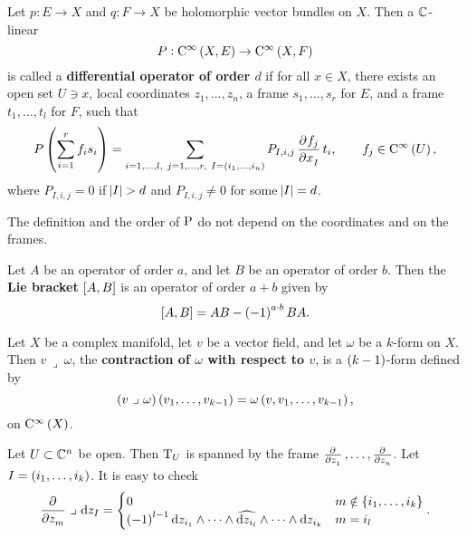 \begin{definition}
Let $ p : E \to X $ and $ q : F \to X $ be holomorphic vector bundles on $ X $. Then a $ \CC $-linear
$$ P : \C^\infty\br{X, E} \to \C^\infty\br{X, F} $$
is called a \textbf{differential operator of order $ d $} if for all $ x \in X $, there exists an open set $ U \ni x $, local coordinates $ z_1, \dots, z_n $, a frame $ s_1, \dots, s_r $ for $ E $, and a frame $ t_1, \dots, t_l $ for $ F $, such that
$$ P\br{\sum_{i = 1}^r f_is_i} = \sum_{i = 1, \dots, l, \ j = 1, \dots, r, \ I = \br{i_1, \dots, i_n}} P_{I, i, j}\dpd{f_j}{x_I}t_i, \qquad f_j \in \C^\infty\br{U}, $$
where $ P_{I, i, j} = 0 $ if $ \abs{I} > d $ and $ P_{I, i, j} \ne 0 $ for some $ \abs{I} = d $.
\end{definition}

\begin{fact*}
The definition and the order of $ \P $ do not depend on the coordinates and on the frames.
\end{fact*}

\pagebreak

\begin{notation}
Let $ A $ be an operator of order $ a $, and let $ B $ be an operator of order $ b $. Then the \textbf{Lie bracket} $ \sbr{A, B} $ is an operator of order $ a + b $ given by
$$ \sbr{A, B} = AB - \br{-1}^{a \cdot b}BA. $$
\end{notation}

\begin{definition}
Let $ X $ be a complex manifold, let $ v $ be a vector field, and let $ \omega $ be a $ k $-form on $ X $. Then $ v \ \lrcorner \ \omega $, the \textbf{contraction of $ \omega $ with respect to $ v $}, is a $ \br{k - 1} $-form defined by
$$ \br{v \ \lrcorner \ \omega}\br{v_1, \dots, v_{k - 1}} = \omega\br{v, v_1, \dots, v_{k - 1}}, $$
on $ \C^\infty\br{X} $.
\end{definition}


\begin{example}
Let $ U \subset \CC^n $ be open. Then $ \T_U $ is spanned by the frame $ \tpd{}{z_1}, \dots, \tpd{}{z_n} $. Let $ I = \br{i_1, \dots, i_k} $. It is easy to check
$$ \dpd{}{z_m} \ \lrcorner \ \d z_I =
\begin{cases}
0 & m \notin \cbr{i_1, \dots, i_k} \\
\br{-1}^{l - 1} \d z_{i_1} \wedge \dots \wedge \widehat{\d z_{i_l}} \wedge \dots \wedge \d z_{i_k} & m = i_l
\end{cases}.
$$
\end{example}

